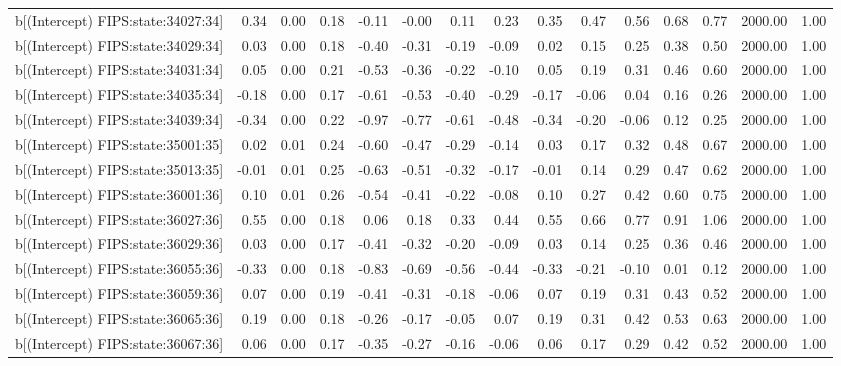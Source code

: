 \begin{table}[ht]
\begin{tabular}{rrrrrrrrrrrrrrr}
  b[(Intercept) FIPS:state:34027:34] & 0.34 & 0.00 & 0.18 & -0.11 & -0.00 & 0.11 & 0.23 & 0.35 & 0.47 & 0.56 & 0.68 & 0.77 & 2000.00 & 1.00 \\ 
  b[(Intercept) FIPS:state:34029:34] & 0.03 & 0.00 & 0.18 & -0.40 & -0.31 & -0.19 & -0.09 & 0.02 & 0.15 & 0.25 & 0.38 & 0.50 & 2000.00 & 1.00 \\ 
  b[(Intercept) FIPS:state:34031:34] & 0.05 & 0.00 & 0.21 & -0.53 & -0.36 & -0.22 & -0.10 & 0.05 & 0.19 & 0.31 & 0.46 & 0.60 & 2000.00 & 1.00 \\ 
  b[(Intercept) FIPS:state:34035:34] & -0.18 & 0.00 & 0.17 & -0.61 & -0.53 & -0.40 & -0.29 & -0.17 & -0.06 & 0.04 & 0.16 & 0.26 & 2000.00 & 1.00 \\ 
  b[(Intercept) FIPS:state:34039:34] & -0.34 & 0.00 & 0.22 & -0.97 & -0.77 & -0.61 & -0.48 & -0.34 & -0.20 & -0.06 & 0.12 & 0.25 & 2000.00 & 1.00 \\ 
  b[(Intercept) FIPS:state:35001:35] & 0.02 & 0.01 & 0.24 & -0.60 & -0.47 & -0.29 & -0.14 & 0.03 & 0.17 & 0.32 & 0.48 & 0.67 & 2000.00 & 1.00 \\ 
  b[(Intercept) FIPS:state:35013:35] & -0.01 & 0.01 & 0.25 & -0.63 & -0.51 & -0.32 & -0.17 & -0.01 & 0.14 & 0.29 & 0.47 & 0.62 & 2000.00 & 1.00 \\ 
  b[(Intercept) FIPS:state:36001:36] & 0.10 & 0.01 & 0.26 & -0.54 & -0.41 & -0.22 & -0.08 & 0.10 & 0.27 & 0.42 & 0.60 & 0.75 & 2000.00 & 1.00 \\ 
  b[(Intercept) FIPS:state:36027:36] & 0.55 & 0.00 & 0.18 & 0.06 & 0.18 & 0.33 & 0.44 & 0.55 & 0.66 & 0.77 & 0.91 & 1.06 & 2000.00 & 1.00 \\ 
  b[(Intercept) FIPS:state:36029:36] & 0.03 & 0.00 & 0.17 & -0.41 & -0.32 & -0.20 & -0.09 & 0.03 & 0.14 & 0.25 & 0.36 & 0.46 & 2000.00 & 1.00 \\ 
  b[(Intercept) FIPS:state:36055:36] & -0.33 & 0.00 & 0.18 & -0.83 & -0.69 & -0.56 & -0.44 & -0.33 & -0.21 & -0.10 & 0.01 & 0.12 & 2000.00 & 1.00 \\ 
  b[(Intercept) FIPS:state:36059:36] & 0.07 & 0.00 & 0.19 & -0.41 & -0.31 & -0.18 & -0.06 & 0.07 & 0.19 & 0.31 & 0.43 & 0.52 & 2000.00 & 1.00 \\ 
  b[(Intercept) FIPS:state:36065:36] & 0.19 & 0.00 & 0.18 & -0.26 & -0.17 & -0.05 & 0.07 & 0.19 & 0.31 & 0.42 & 0.53 & 0.63 & 2000.00 & 1.00 \\ 
  b[(Intercept) FIPS:state:36067:36] & 0.06 & 0.00 & 0.17 & -0.35 & -0.27 & -0.16 & -0.06 & 0.06 & 0.17 & 0.29 & 0.42 & 0.52 & 2000.00 & 1.00 \\ 

\end{tabular}
\end{table}
